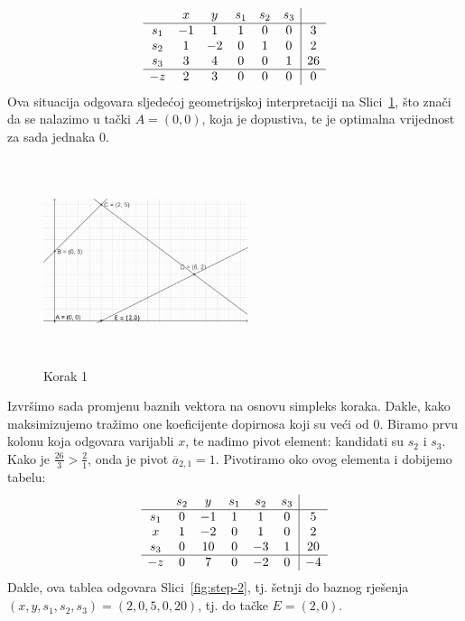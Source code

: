 \documentclass[a4paper, utf8, 11pt, colorlinks]{article}
\begin{document}
$$\begin{array}{cccccc| c}
        & x & y & s_1 & s_2 & s_3 & \\ \hline
   s_1  & -1 & 1 & 1 & 0 & 0 & 3 \\
   s_2  & 1 & -2 & 0 & 1 & 0 & 2 \\
   s_3  & 3 & 4 & 0 & 0 & 1 & 26 \\ \hline
    -z  & 2 & 3 & 0 & 0 & 0 & 0 \\
\end{array}
$$ 
Ova situacija odgovara sljedećoj geometrijskoj interpretaciji na Slici~\ref{fig:step-1}, što znači da se nalazimo u tački $A=(0,0)$, koja je dopustiva, te je optimalna vrijednost za sada jednaka 0. 
\begin{figure}[H]
	\centering
	\includegraphics[width=170pt, height=170pt]{simpleks-primjer-2-sl1.eps}
	\caption{Korak 1}
	\label{fig:step-1}
\end{figure}

Izvršimo sada promjenu baznih vektora na osnovu simpleks koraka. Dakle, kako maksimizujemo 
tražimo one koeficijente dopirnosa koji su veći od 0. Biramo prvu kolonu koja odgovara varijabli $x$, te nađimo 
pivot element: kandidati su $s_2$ i $s_3$. Kako je $\frac{26}{3} > \frac{2}{1}$, onda je  pivot $\overline{a}_{2, 1} = 1$. Pivotiramo oko ovog elementa i dobijemo tabelu:
$$\begin{array}{cccccc| c}
       & s_2  & y  & s_1  & s_2 & s_3 &    \\ \hline
   s_1 & 0    & -1  & 1  & 1 & 0  &  5     \\
   x   & 1    & -2  & 0  & 1 & 0  &  2     \\
   s_3 & 0    & 10   &  0  & -3 & 1 & 20   \\ \hline
   -z  & 0    &  7   & 0   & -2 & 0 & -4   \\ 
\end{array}
$$ 
Dakle, ova tablea odgovara Slici~\ref{fig:step-2}, tj. šetnji do baznog rješenja $(x,y, s_1, s_2, s_3)=(2, 0, 5, 0 ,20)$, tj. do tačke $E=(2, 0)$. 
\end{document}
